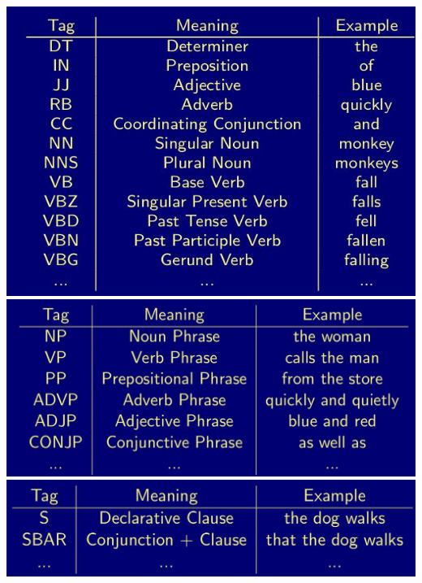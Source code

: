 \includegraphics[width=\textwidth]{media/relation_extraction_1.jpg} \\
\includegraphics[width=\textwidth]{media/relation_extraction_2.jpg} \\
\includegraphics[width=\textwidth]{media/relation_extraction_3.jpg} \\

